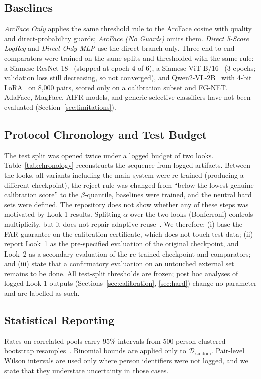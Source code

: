 \documentclass[journal]{IEEEtran}
\begin{document}
\subsection{Baselines}
\emph{ArcFace Only} applies the same threshold rule to the ArcFace cosine with quality and direct-probability guards; \emph{ArcFace (No Guards)} omits them. \emph{Direct 5-Score LogReg} and \emph{Direct-Only MLP} use the direct branch only. Three end-to-end comparators were trained on the same splits and thresholded with the same rule: a Siamese ResNet-18~\cite{chopra2005siamese} (stopped at epoch 4 of 6), a Siamese ViT-B/16~\cite{dosovitskiy2021vit} (3 epochs; validation loss still decreasing, so not converged), and Qwen2-VL-2B~\cite{wang2024qwen2vl} with 4-bit LoRA~\cite{hu2022lora} on 8,000 pairs, scored only on a calibration subset and FG-NET. AdaFace, MagFace, AIFR models, and generic selective classifiers have not been evaluated (Section~\ref{sec:limitations}).

\subsection{Protocol Chronology and Test Budget}
\label{sec:chronology}
The test split was opened twice under a logged budget of two looks. Table~\ref{tab:chronology} reconstructs the sequence from logged artifacts. Between the looks, all variants including the main system were re-trained (producing a different checkpoint), the reject rule was changed from ``below the lowest genuine calibration score'' to the $\beta$-quantile, baselines were trained, and the neutral hard sets were defined. The repository does not show whether any of these steps was motivated by Look-1 results. Splitting $\alpha$ over the two looks (Bonferroni) controls multiplicity, but it does not repair adaptive reuse~\cite{angelopoulos2021ltt}. We therefore: (i) base the FAR guarantee on the calibration certificate, which does not touch test data; (ii) report Look~1 as the pre-specified evaluation of the original checkpoint, and Look~2 as a secondary evaluation of the re-trained checkpoint and comparators; and (iii) state that a confirmatory evaluation on an untouched external set remains to be done. All test-split thresholds are frozen; post hoc analyses of logged Look-1 outputs (Sections~\ref{sec:calibration}, \ref{sec:hard}) change no parameter and are labelled as such.



\subsection{Statistical Reporting}
Rates on correlated pools carry 95\% intervals from 500 person-clustered bootstrap resamples~\cite{bolle2004subsets,schuckers2010book}. Binomial bounds are applied only to $\mathcal{D}_{\text{random}}$. Pair-level Wilson intervals are used only where person identifiers were not logged, and we state that they understate uncertainty in those cases.
\end{document}
